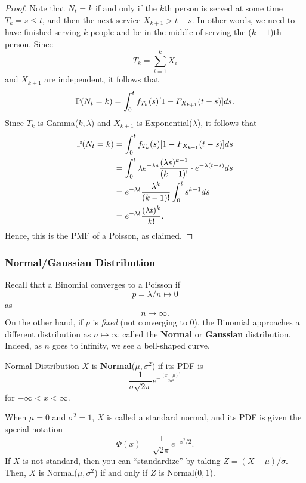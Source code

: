 \documentclass[letterpaper]{article}
\begin{document}
\begin{mdframed}[]
    \begin{proof}
        Note that $N_t = k$ if and only if the $k$th person is served at some time $T_k = s \leq t$, and then the next service $X_{k + 1} > t - s$. In other words, we need to have finished serving $k$ people and be in the middle of serving the ($k + 1$)th person. Since \[T_k = \sum_{i = 1}^{k} X_i\] and $X_{k + 1}$ are independent, it follows that 
        \[\mathbb{P}(N_t = k) = \int_{0}^t f_{T_k}(s) [1 - F_{X_{k + 1}} (t - s)] ds.\]
        Since $T_k$ is Gamma($k, \lambda$) and $X_{k + 1}$ is Exponential($\lambda$), it follows that 
        \begin{equation*}
            \begin{aligned}
                \PR(N_t = k) &= \int_{0}^t f_{T_k}(s) [1 - F_{X_{k + 1}} (t - s)] ds \\ 
                    &= \int_{0}^{t} \lambda e^{-\lambda s} \frac{(\lambda s)^{k - 1}}{(k - 1)!} \cdot e^{-\lambda (t - s)} ds \\ 
                    &= e^{-\lambda t} \frac{\lambda^k}{(k - 1)!} \int_{0}^{t} s^{k - 1} ds \\ %
                    &= e^{-\lambda t} \frac{(\lambda t)^k}{k!}.
            \end{aligned}
        \end{equation*}
        Hence, this is the PMF of a Poisson, as claimed. 
    \end{proof}
\end{mdframed}

\subsubsection{Normal/Gaussian Distribution}
Recall that a Binomial converges to a Poisson if 
\[p = \lambda / n \mapsto 0\]
as \[n \mapsto \infty.\]
On the other hand, if $p$ is \emph{fixed} (not converging to 0), the Binomial approaches a different distribution as $n \mapsto \infty$ called the \textbf{Normal} or \textbf{Gaussian} distribution. Indeed, as $n$ goes to infinity, we see a bell-shaped curve. 
\begin{definition}{Normal Distribution}{}
    $X$ is \textbf{Normal}($\mu, \sigma^2$) if its PDF is 
    \[\frac{1}{\sigma \sqrt{2\pi}} e^{-\frac{(x - \mu)^2}{2 \sigma^2}}\]
    for $-\infty < x < \infty$. 
\end{definition}
When $\mu = 0$ and $\sigma^2 = 1$, $X$ is called a standard normal, and its PDF is given the special notation 
\[\Phi(x) = \frac{1}{\sqrt{2\pi}} e^{-x^2 / 2}.\]
If $X$ is not standard, then you can ``standardize'' by taking $Z = (X - \mu) / \sigma$. Then, $X$ is Normal($\mu, \sigma^2$) if and only if $Z$ is Normal($0, 1$).
\end{document}
